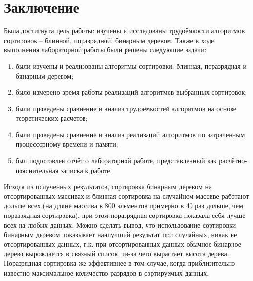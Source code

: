 \chapter*{Заключение}

Была достигнута цель работы: изучены и исследованы трудоёмкости алгоритмов сортировок -- блинной, поразрядной, бинарным деревом. 
Также в ходе выполнения лабораторной работы были решены следующие задачи:

\begin{enumerate}[label=\arabic*)]
	\item были изучены и реализованы алгоритмы сортировки: блинная, поразрядная и бинарным деревом;
	\item было измерено время работы реализаций алгоритмов выбранных сортировок;
    \item были проведены сравнение и анализ трудоёмкостей алгоритмов на основе теоретических расчетов;
    \item были проведены сравнение и анализ реализаций алгоритмов по затраченным процессорному времени и памяти;
	\item был подготовлен отчёт о лабораторной работе, представленный как расчётно-пояснительная записка к работе.
\end{enumerate}



Исходя из полученных результатов, сортировка бинарным деревом на отсортированных массивах и блинная сортировка на случайном массиве работают дольше всех (на длине массива в 800 элементов примерно в 40 раз дольше, чем поразрядная сортировка), при этом поразрядная сортировка показала себя лучше всех на любых данных. Можно сделать вывод, что использование сортировки бинарным деревом показывает наилучший результат при случайных, никак не отсортированных данных, т.к. при отсортированных данных обычное бинарное дерево вырождается в связный список, из-за чего вырастает высота дерева. Поразрядная сортировка же эффективнее в том случае, когда приблизительно известно максимальное количество разрядов в сортируемых данных.
